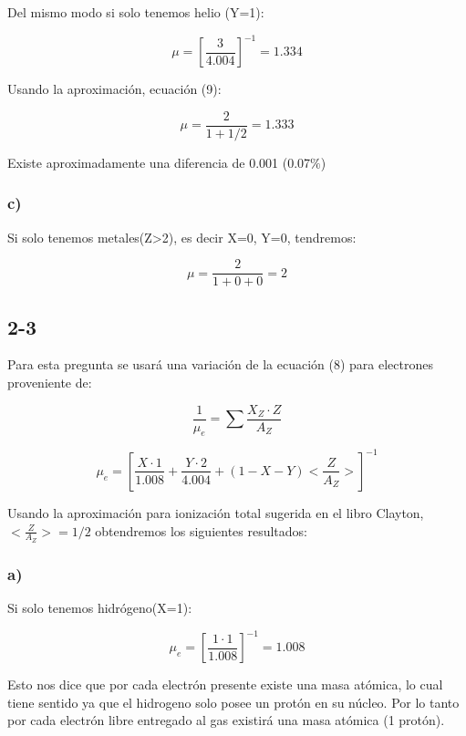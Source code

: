 \documentclass[2pt]{article}
\begin{document}
Del mismo modo si solo tenemos helio (Y=1):

\begin{equation}
\mu=[\frac{3}{4.004}]^{-1}=1.334
\end{equation} 

Usando la aproximación, ecuación (9):

\begin{equation}
\mu = \frac{2}{1+1/2} = 1.333
\end{equation}

Existe aproximadamente una diferencia de 0.001 (0.07$\%$)

\subsubsection*{c)}

Si solo tenemos metales(Z>2), es decir X=0, Y=0, tendremos:

\begin{equation}
\mu=\frac{2}{1+0+0}=2
\end{equation} 


\subsection*{2-3}

Para esta pregunta se usará una variación de la ecuación (8) para electrones proveniente de:

\begin{equation}
\frac{1}{\mu_e}=\sum\frac{X_Z\cdot Z}{A_Z}
\end{equation}

\begin{equation}
\mu_e=[\frac{X\cdot 1}{1.008} + \frac{Y\cdot 2}{4.004} + (1-X-Y)<\frac{Z}{A_Z}>]^{-1}
\end{equation}

Usando la aproximación para ionización total sugerida en el libro Clayton, $<\frac{Z}{A_Z}>=1/2$ obtendremos los siguientes resultados:

\subsubsection*{a)}

Si solo tenemos hidrógeno(X=1):

\begin{equation}
\mu_e=[\frac{1\cdot 1}{1.008}]^{-1}=1.008
\end{equation}

Esto nos dice que por cada electrón presente existe una masa atómica, lo cual tiene sentido ya que el hidrogeno solo posee un protón en su núcleo. Por lo tanto por cada electrón libre entregado al gas existirá una masa atómica (1 protón).
\end{document}
